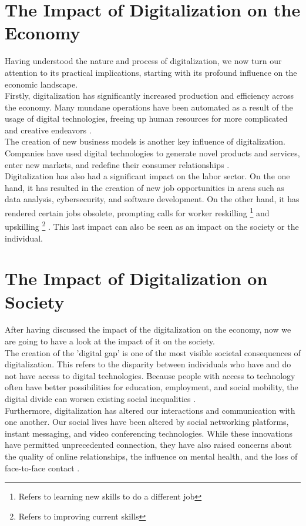 \documentclass[12pt]{article}
\begin{document}
\section{The Impact of Digitalization on the Economy}
Having understood the nature and process of digitalization, we now turn our attention to its practical implications, starting with its profound influence on the economic landscape. \\
Firstly, digitalization has significantly increased production and efficiency across the economy. Many mundane operations have been automated as a result of the usage of digital technologies, freeing up human resources for more complicated and creative endeavors \cite{Parviainen.2017}. \\
The creation of new business models is another key influence of digitalization. Companies have used digital technologies to generate novel products and services, enter new markets, and redefine their consumer relationships \cite{Tschandl.2019}. \\
Digitalization has also had a significant impact on the labor sector. On the one hand, it has resulted in the creation of new job opportunities in areas such as data analysis, cybersecurity, and software development. On the other hand, it has rendered certain jobs obsolete, prompting calls for worker reskilling \footnote{Refers to learning new skills to do a different job} and upskilling \footnote{Refers to improving current skills} \cite{Parviainen.2017}. This last impact can also be seen as an impact on the society or the individual.

\section{The Impact of Digitalization on Society}
After having discussed the impact of the digitalization on the economy, now we are going to have a look at the impact of it on the society. \\
The creation of the 'digital gap' is one of the most visible societal consequences of digitalization. This refers to the disparity between individuals who have and do not have access to digital technologies. Because people with access to technology often have better possibilities for education, employment, and social mobility, the digital divide can worsen existing social inequalities \cite{Jamil.2021}. \\
Furthermore, digitalization has altered our interactions and communication with one another. Our social lives have been altered by social networking platforms, instant messaging, and video conferencing technologies. While these innovations have permitted unprecedented connection, they have also raised concerns about the quality of online relationships, the influence on mental health, and the loss of face-to-face contact \cite{HenningHummert.2018}.
\end{document}
